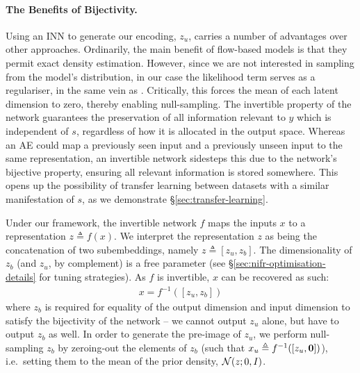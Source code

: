 \paragraph{The Benefits of Bijectivity.}
%
Using an \ac{INN} to generate our encoding, $z_u$, carries a number of advantages over other
approaches. 
%
Ordinarily, the main benefit of flow-based models is that they permit exact density estimation.
%
However, since we are not interested in sampling from the model's distribution, in our case the
likelihood term serves as a regulariser, in the same vein as \citet{JacSmeOya18}.
%
Critically, this forces the mean of each latent dimension to zero, thereby enabling null-sampling.
%
The invertible property of the network guarantees the preservation of all information relevant to
$y$ which is independent of $s$, regardless of how it is allocated in the output space. 
%
%
%
Whereas an \acf{AE} could map a previously seen input and a previously unseen input to the same
representation, an invertible network sidesteps this due to the network's bijective property,
ensuring all relevant information is stored somewhere. 
%
This opens up the possibility of transfer learning between datasets with a similar manifestation of
$s$, as we demonstrate \S\ref{sec:transfer-learning}.

Under our framework, the invertible network $f$ maps the inputs $x$ to a representation
$z \triangleq f(x)$.
%
We interpret the representation $z$ as being the concatenation of two subembeddings, namely \( z
\triangleq [z_u, z_b] \). 
%
The dimensionality of $z_b$ (and $z_u$, by complement) is a free parameter (see
\S\ref{sec:nifr-optimisation-details} for tuning strategies). 
%
As $f$ is invertible, $x$ can be recovered as such:
%
\begin{align}
  x = f^{-1}([z_u, z_b])
  \label{eq:zreconstruct}
\end{align}
%
where $z_b$ is required for equality of the output dimension and input dimension to satisfy
the bijectivity of the network -- we cannot output $z_u$ alone, but have to output $z_b$
as well. 
%
In order to generate the pre-image of $z_u$, we perform null-sampling \wrt{} $z_b$ by zeroing-out
the elements of $z_b$ (such that $x_u \triangleq f^{-1}([z_{u}, {\bm{0}}])$), i.e.\ setting them to
the mean of the prior density, ${\mathcal{N}}(z;0, I)$.

